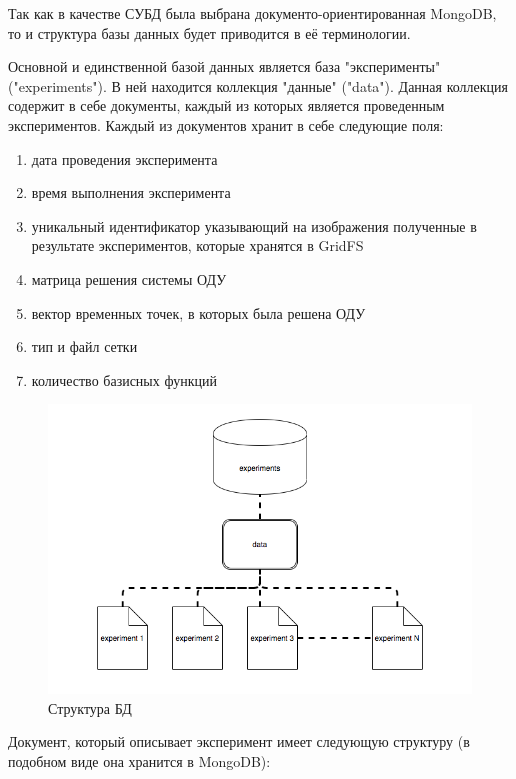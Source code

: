 \documentclass[14pt]{extreport}
\begin{document}
Так как в качестве СУБД была выбрана документо-ориентированная MongoDB, то и структура базы данных будет приводится в её терминологии. 

Основной и единственной базой данных является база "эксперименты" ("experiments"). В ней находится коллекция  "данные" ("data"). Данная коллекция содержит в себе документы, каждый из которых является проведенным экспериментов. Каждый из документов хранит в себе следующие поля:

\begin{enumerate}
\item дата проведения эксперимента
\item время выполнения эксперимента
\item уникальный идентификатор указывающий на изображения полученные в результате экспериментов, которые хранятся в GridFS
\item матрица решения системы ОДУ
\item вектор временных точек, в которых была решена ОДУ
\item тип и файл сетки
\item количество базисных функций
\end{enumerate}


\begin{figure}[H]
\centerline{
\includegraphics[width=1.0\linewidth]{images/database}}
\caption{Структура БД}
\label{img:database}
\end{figure}

Документ, который описывает эксперимент имеет следующую структуру (в подобном виде она хранится в MongoDB):

\begin{minipage}{\linewidth}

\end{minipage}
\end{document}

